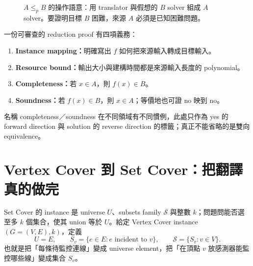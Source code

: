 \documentclass[11pt,a4paper,oneside,openany]{book}
\begin{document}
\begin{figure}[htbp]
\centering
{}
\caption{$A\le_p B$ 的操作語意：用 translator 與假想的 $B$ solver 組成 $A$ solver。要證明目標 $B$ 困難，來源 $A$ 必須是已知困難問題。}
\label{fig:reduction-map}
\end{figure}

一份可審查的 reduction proof 有四項義務：
\begin{enumerate}[label=\textbf{R\arabic*.}]
\item \textbf{Instance mapping：}明確寫出 $f$ 如何把來源輸入轉成目標輸入。
\item \textbf{Resource bound：}輸出大小與建構時間都是來源輸入長度的 polynomial。
\item \textbf{Completeness：}若 $x\in A$，則 $f(x)\in B$。
\item \textbf{Soundness：}若 $f(x)\in B$，則 $x\in A$；等價地也可證 no 映到 no。
\end{enumerate}
名稱 completeness／soundness 在不同領域有不同慣例，此處只作為 yes 的 forward direction 與 solution 的 reverse direction 的標籤；真正不能省略的是雙向 equivalence。

\section{Vertex Cover 到 Set Cover：把翻譯真的做完}
Set Cover 的 instance 是 universe $U$、subsets family $\mathcal S$ 與整數 $k$；問題問能否選至多 $k$ 個集合，使其 union 等於 $U$。給定 Vertex Cover instance $(G=(V,E),k)$，定義
\[
 U=E,\qquad
 S_v=\{e\in E: e\text{ incident to }v\},\qquad
 \mathcal S=\{S_v:v\in V\}.
\]
也就是把「每條待監控連線」變成 universe element，把「在頂點 $v$ 放感測器能監控哪些線」變成集合 $S_v$。
\end{document}
